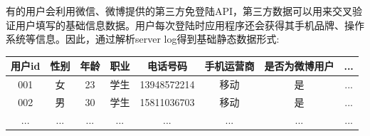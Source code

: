 \label{chap:example}
\begin{figure}
\centering
  \label{pic:hl_userProfile}
\end{figure}
有的用户会利用微信、微博提供的第三方免登陆API，第三方数据可以用来交叉验证用户填写的基础信息数据。用户每次登陆时应用程序还会获得其手机品牌、操作系统等信息。因此，通过解析server log得到基础静态数据形式:
  \begin{table}[htp]
  \centering
  \label{tab:tagweight}
  \begin{tabular}{|c|c|c|c|c|c|c|c|} \hline
   用户id & 性别 & 年龄 & 职业 & 电话号码 & 手机运营商 & 是否为微博用户 & ... \\ \hline
   001 & 女 & 23 & 学生 & 13948572214 & 移动 & 是 & ... \\ \hline
   002 & 男 & 30 & 学生 & 15811036703 & 移动 & 是 & ... \\ \hline
   ... & ... & ... & ... & ... & ... & ... & ... \\ \hline
  \end{tabular}
  \end{table}

